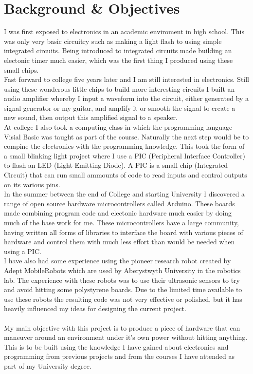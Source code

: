 \chapter{Background \& Objectives}

I was first exposed to electronics in an academic enviroment in high school.  This was only very basic circuitry such as making a light flash to using simple integrated circuits.  Being introduced to integrated circuits made building an electonic timer much easier, which was the first thing I produced using these small chips.
\\Fast forward to college five years later and I am still interested in electronics.  Still using these wonderous little chips to build more interesting circuits I built an audio amplifier whereby I input a waveform into the circuit, either generated by a signal generator or my guitar, and amplify it or smooth the signal to create a new sound, then output this amplified signal to a speaker.
\\At college I also took a computing class in which the programming language Visial Basic was taught as part of the course.  Naturally the next step would be to compine the electronics with the programming knowledge.  This took the form of a small blinking light project where I use a PIC (Peripheral Interface Controller) to flash an LED (Light Emitting Diode).  A PIC is a small chip (Integrated Circuit) that can run small ammounts of code to read inputs and control outputs on its various pins.
\\In the summer between the end of College and starting University I discovered a range of open source hardware microcontrollers called Arduino.  These boards made combining program code and electonic hardware much easier by doing much of the base work for me.  These microcontrollers have a large community, having written all forms of libraries to interface the board with various pieces of hardware and control them with much less effort than would be needed when using a PIC.
\\I have also had some experience using the pioneer research robot created by Adept MobileRobots \cite{mobilerobots} which are used by Aberystwyth University in the robotics lab.  The experience with these robots was to use their ultrasonic sensors to try and avoid hitting some polystyrene boards.  Due to the limited time available to use these robots the resulting code was not very effective or polished, but it has heavily influenced my ideas for designing the current project.
\\\\My main objective with this project is to produce a piece of hardware that can maneuver around an environment under it's own power without hitting anything.  This is to be built using the knowledge I have gained about electronics and programming from previous projects and from the courses I have attended as part of my University degree.
